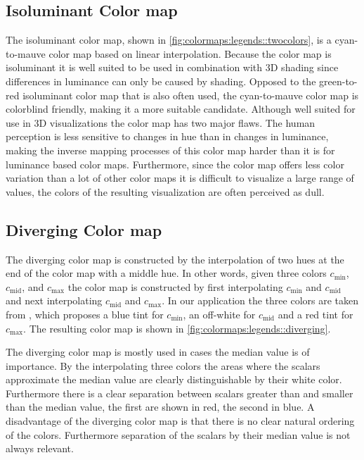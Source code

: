 \subsection{Isoluminant Color map} %
\label{sub:two_hue_colormap}
The isoluminant color map, shown in \cref{fig:colormaps:legends::twocolors}, is a cyan-to-mauve color map based on linear interpolation\cite{divergingMoreland2009}. Because the color map is isoluminant it is well suited to be used in combination with 3D shading since differences in luminance can only be caused by shading. Opposed to the green-to-red isoluminant color map that is also often used, the cyan-to-mauve color map is colorblind friendly, making it a more suitable candidate. Although well suited for use in 3D visualizations the color map has two major flaws. The human perception is less sensitive to changes in hue than in changes in luminance, making the inverse mapping processes of this color map harder than it is for luminance based color maps. Furthermore, since the color map offers less color variation than a lot of other color maps it is  difficult to visualize a large range of values, the colors of the resulting visualization are often perceived as dull.

\subsection{Diverging Color map} %
\label{sub:diverging_colormap}
The diverging color map is constructed by the interpolation of two hues at the end of the color map with a middle hue. In other words, given three colors $c_{\text{min}}$, $c_{\text{mid}}$, and $c_{\text{max}}$ the color map is constructed by first interpolating $c_{\text{min}}$ and $c_{\text{mid}}$ and next interpolating $c_{\text{mid}}$ and $c_{\text{max}}$. In our application the three colors are taken from \cite{divergingMoreland2009}, which proposes a blue tint for $c_{\text{min}}$, an off-white for $c_{\text{mid}}$ and a red tint for $c_{\text{max}}$. The resulting color map is shown in \cref{fig:colormaps:legends::diverging}. 

The diverging color map is mostly used in cases the median value is of importance. By the interpolating three colors the areas where the scalars approximate the median value are clearly distinguishable by their white color. Furthermore there is a clear separation between scalars greater than and smaller than the median value, the first are shown in red, the second in blue. A disadvantage of the diverging color map is that there is no clear natural ordering of the colors. Furthermore separation of the scalars by their median value is not always relevant.

